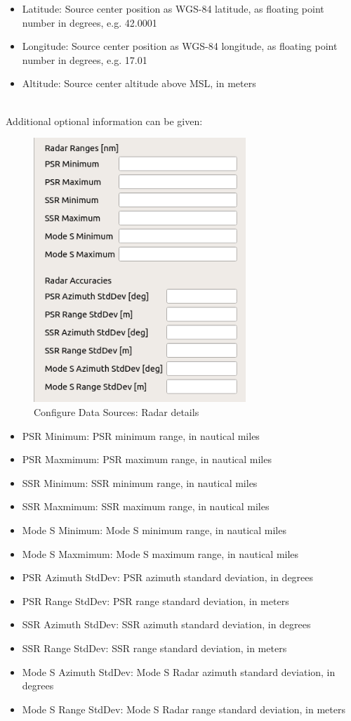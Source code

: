 \begin{itemize}
\item Latitude: Source center position as WGS-84 latitude, as floating point number in degrees, e.g. 42.0001
\item Longitude: Source center position as WGS-84 longitude, as floating point number in degrees, e.g. 17.01
\item Altitude: Source center altitude above MSL, in meters
\end{itemize}
\ \\

Additional optional information can be given:

\begin{figure}[H]
  \center
    \includegraphics[width=8cm,frame]{figures/configure_data_sources_radar_details.png}
  \caption{Configure Data Sources: Radar details}
\end{figure}

\begin{itemize}
\item PSR Minimum: PSR minimum range, in nautical miles
\item PSR Maxmimum: PSR maximum range, in nautical miles
\item SSR Minimum: SSR minimum range, in nautical miles
\item SSR Maxmimum: SSR maximum range, in nautical miles
\item Mode S Minimum: Mode S minimum range, in nautical miles
\item Mode S Maxmimum: Mode S maximum range, in nautical miles
\item PSR Azimuth StdDev: PSR azimuth standard deviation, in degrees
\item PSR Range StdDev: PSR range standard deviation, in meters
\item SSR Azimuth StdDev: SSR azimuth standard deviation, in degrees
\item SSR Range StdDev: SSR range standard deviation, in meters
\item Mode S Azimuth StdDev: Mode S Radar azimuth standard deviation, in degrees
\item Mode S Range StdDev: Mode S Radar range standard deviation, in meters
\end{itemize}
\ \\

